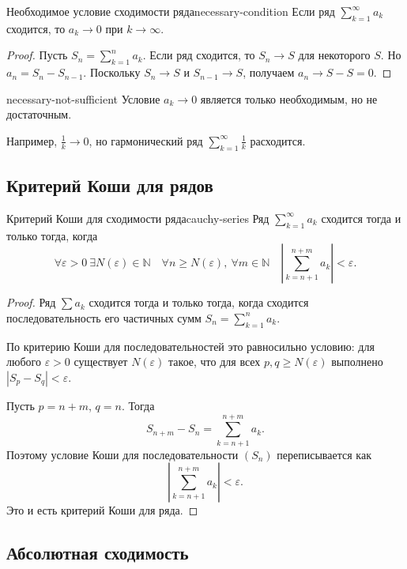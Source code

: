 \begin{Proposition}{Необходимое условие сходимости ряда}{necessary-condition}
	Если ряд $\sum\limits_{k=1}^{\infty} a_k$ сходится, то $a_k \to 0$ при $k \to \infty$.
\end{Proposition}

\begin{proof}
	Пусть $S_n = \sum\limits_{k=1}^{n} a_k$. Если ряд сходится, то $S_n \to S$ для некоторого $S$. Но $a_n = S_n - S_{n-1}$. Поскольку $S_n \to S$ и $S_{n-1} \to S$, получаем $a_n \to S-S=0$.
\end{proof}

\begin{Remark}{}{necessary-not-sufficient}
	Условие $a_k \to 0$ является только необходимым, но не достаточным.
	
	Например, $\frac1k \to 0$, но гармонический ряд $\sum\limits_{k=1}^{\infty}\frac1k$ расходится.
\end{Remark}

\subsection{Критерий Коши для рядов}

\begin{Theorem}{Критерий Коши для сходимости ряда}{cauchy-series}
	Ряд $\sum\limits_{k=1}^{\infty} a_k$ сходится тогда и только тогда, когда
	\[
	\forall \varepsilon > 0 \ \exists N(\varepsilon) \in \mathbb{N}
	\quad
	\forall n \ge N(\varepsilon),\ \forall m \in \mathbb{N}
	\quad
	\left|\sum_{k=n+1}^{n+m} a_k\right| < \varepsilon.
	\]
\end{Theorem}

\begin{proof}
	Ряд $\sum a_k$ сходится тогда и только тогда, когда сходится последовательность его частичных сумм $S_n = \sum\limits_{k=1}^{n} a_k$.
	
	По критерию Коши для последовательностей это равносильно условию: для любого $\varepsilon > 0$ существует $N(\varepsilon)$ такое, что для всех $p,q \ge N(\varepsilon)$ выполнено $|S_p-S_q|<\varepsilon$.
	
	Пусть $p=n+m$, $q=n$. Тогда
	\[
	S_{n+m}-S_n
	=
	\sum_{k=n+1}^{n+m} a_k.
	\]
	Поэтому условие Коши для последовательности $(S_n)$ переписывается как
	\[
	\left|\sum_{k=n+1}^{n+m} a_k\right| < \varepsilon.
	\]
	Это и есть критерий Коши для ряда.
\end{proof}

\subsection{Абсолютная сходимость}

